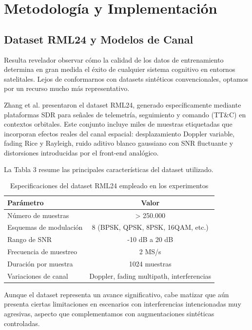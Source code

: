 \section{Metodología y Implementación}

\subsection{Dataset RML24 y Modelos de Canal}

Resulta revelador observar cómo la calidad de los datos de entrenamiento determina en gran medida el éxito de cualquier sistema cognitivo en entornos satelitales. Lejos de conformarnos con datasets sintéticos convencionales, optamos por un recurso mucho más representativo.

Zhang et al. \cite{Zhang2026} presentaron el dataset RML24, generado específicamente mediante plataformas SDR para señales de telemetría, seguimiento y comando (TT\&C) en contextos orbitales. Este conjunto incluye miles de muestras etiquetadas que incorporan efectos reales del canal espacial: desplazamiento Doppler variable, fading Rice y Rayleigh, ruido aditivo blanco gaussiano con SNR fluctuante y distorsiones introducidas por el front-end analógico. 

La Tabla 3 resume las principales características del dataset utilizado.

\begin{table}[h]
\centering
\caption{Especificaciones del dataset RML24 empleado en los experimentos}
\label{tab:dataset_rml24}
\begin{tabular}{lc}
\hline
\textbf{Parámetro} & \textbf{Valor} \\
\hline
Número de muestras & > 250.000 \\
Esquemas de modulación & 8 (BPSK, QPSK, 8PSK, 16QAM, etc.) \\
Rango de SNR & -10 dB a 20 dB \\
Frecuencia de muestreo & 2 MS/s \\
Duración por muestra & 1024 muestras \\
Variaciones de canal & Doppler, fading multipath, interferencias \\
\hline
\end{tabular}
\end{table}

Aunque el dataset representa un avance significativo, cabe matizar que aún presenta ciertas limitaciones en escenarios con interferencias intencionadas muy agresivas, aspecto que complementamos con augmentaciones sintéticas controladas.

